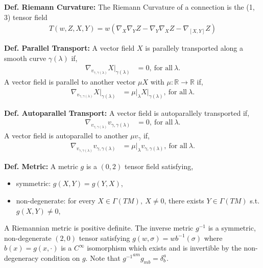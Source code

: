 \documentclass[12pt]{article}
\begin{document}
\begin{multicols}{2}
  \noindent
  \textbf{Def. Riemann Curvature:}
  The Riemann Curvature of a connection is the (1, 3) tensor field
  \begin{align}
    T(w, Z, X, Y) = w(\nabla_X \nabla_Y Z - \nabla_Y \nabla_X Z - \nabla_{[X, Y]} Z)
  \end{align}

  \noindent
  \textbf{Def. Parallel Transport:}
  A vector field $X$ is parallely transported along a smooth curve $\gamma(\lambda)$ if,
  \begin{align}
    \nabla_{v_{\gamma, \gamma(\lambda)}} X \lvert_{\gamma(\lambda)} &= 0,  \ \textrm{for all} \ \lambda.
  \end{align}
  A vector field is parallel to another vector $\mu X$ with $\mu: \mathbb{R} \rightarrow \mathbb{R}$ if,
  \begin{align}
    \nabla_{v_{\gamma, \gamma(\lambda)}} X \lvert_{\gamma(\lambda)} &= \mu \lvert_{\lambda} X \lvert_{\gamma(\lambda)},
    \ \textrm{for all} \ \lambda.
  \end{align}

  \noindent
  \textbf{Def. Autoparallel Transport:}
  A vector field is autoparallely transported if,
  \begin{align}
    \nabla_{v_{\gamma, \gamma(\lambda)}} v_{\gamma, \gamma(\lambda)} &= 0, \ \textrm{for all} \ \lambda.
  \end{align}
  A vector field is autoparallel to another $\mu v_{\gamma}$ if,
  \begin{align}
    \nabla_{v_{\gamma, \gamma(\lambda)}} v_{\gamma, \gamma(\lambda)} &= \mu \lvert_{\lambda} v_{\gamma, \gamma(\lambda)},
    \ \textrm{for all} \ \lambda.
  \end{align}

  \noindent
  \textbf{Def. Metric:}
  A metric $g$ is a $(0, 2)$ tensor field satisfying,
  \begin{itemize}
  \item symmetric: $g(X, Y) = g(Y, X)$,
  \item non-degenerate: for every $X \in \Gamma(TM),\ X \neq 0$, there exists $Y \in \Gamma(TM)$ s.t. $g(X, Y) \neq 0$,
  \end{itemize}
  A Riemannian metric is positive definite.
  The inverse metric $g^{-1}$ is a symmetric, non-degenerate $(2, 0)$ tensor satisfying $g(w, \sigma) = w b^{-1}(\sigma)$
  where $b(x) = g(x, \cdot)$ is a $C^{\infty}$ isomorphism which exists and is invertible by the non-degeneracy condition
  on $g$. Note that ${g^{-1}}^{am}g_{mb} = \delta^a_b$.


\end{multicols}
\end{document}
